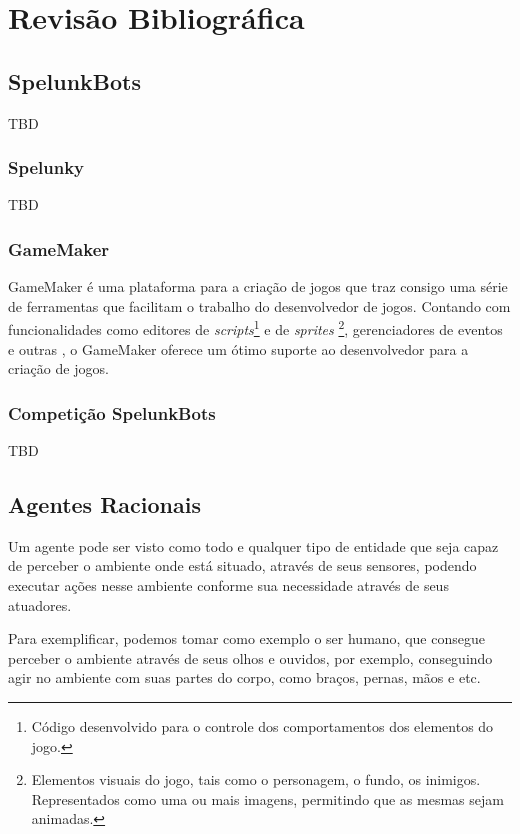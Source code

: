 \chapter{\label{chap:lit-review}Revisão Bibliográfica}

\section{SpelunkBots}

TBD

\subsection{Spelunky}

TBD

\subsection{GameMaker}

GameMaker é uma plataforma para a criação de jogos que traz consigo uma série
de ferramentas que facilitam o trabalho do desenvolvedor de jogos. Contando com
funcionalidades como editores de \textit{scripts}\footnote{Código desenvolvido
para o controle dos comportamentos dos elementos do jogo.} e de \textit{sprites}
\footnote{Elementos visuais do jogo, tais como o personagem, o fundo, os
inimigos. Representados como uma ou mais imagens, permitindo que as mesmas
sejam animadas.},
gerenciadores de eventos e outras \cite{GMAKER8DOCS}, o GameMaker oferece um
ótimo suporte ao desenvolvedor para a criação de jogos.

\subsection{Competição SpelunkBots}

TBD

\section{Agentes Racionais}

Um agente pode ser visto como todo e qualquer tipo de entidade que seja capaz
de perceber o ambiente onde está situado, através de seus sensores, podendo
executar ações nesse ambiente conforme sua necessidade através de seus atuadores.
\cite{Russell:1995:AIM:193191}

Para exemplificar, podemos tomar como exemplo o ser humano, que consegue
perceber o ambiente através de seus olhos e ouvidos, por exemplo, conseguindo
agir no ambiente com suas partes do corpo, como braços, pernas, mãos e etc.
\cite{Russell:1995:AIM:193191}

